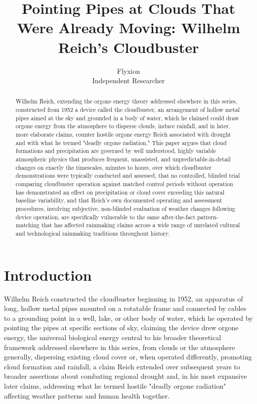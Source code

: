 \documentclass[11pt]{article}
\title{Pointing Pipes at Clouds That Were Already Moving: Wilhelm Reich's Cloudbuster}
\author{Flyxion \\ \small Independent Researcher}
\date{}
\begin{document}
\maketitle

\begin{abstract}
Wilhelm Reich, extending the orgone energy theory addressed elsewhere in this series, constructed from 1952 a device called the cloudbuster, an arrangement of hollow metal pipes aimed at the sky and grounded in a body of water, which he claimed could draw orgone energy from the atmosphere to disperse clouds, induce rainfall, and in later, more elaborate claims, counter hostile orgone energy Reich associated with drought and with what he termed "deadly orgone radiation." This paper argues that cloud formations and precipitation are governed by well understood, highly variable atmospheric physics that produces frequent, unassisted, and unpredictable-in-detail changes on exactly the timescales, minutes to hours, over which cloudbuster demonstrations were typically conducted and assessed, that no controlled, blinded trial comparing cloudbuster operation against matched control periods without operation has demonstrated an effect on precipitation or cloud cover exceeding this natural baseline variability, and that Reich's own documented operating and assessment procedures, involving subjective, non-blinded evaluation of weather changes following device operation, are specifically vulnerable to the same after-the-fact pattern-matching that has affected rainmaking claims across a wide range of unrelated cultural and technological rainmaking traditions throughout history.
\end{abstract}

\section{Introduction}

Wilhelm Reich constructed the cloudbuster beginning in 1952, an apparatus of long, hollow metal pipes mounted on a rotatable frame and connected by cables to a grounding point in a well, lake, or other body of water, which he operated by pointing the pipes at specific sections of sky, claiming the device drew orgone energy, the universal biological energy central to his broader theoretical framework addressed elsewhere in this series, from clouds or the atmosphere generally, dispersing existing cloud cover or, when operated differently, promoting cloud formation and rainfall, a claim Reich extended over subsequent years to broader assertions about combating regional drought and, in his most expansive later claims, addressing what he termed hostile "deadly orgone radiation" affecting weather patterns and human health together.
\end{document}
